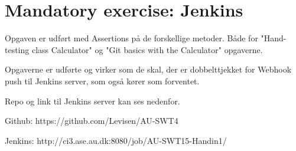 \section{Mandatory exercise: Jenkins}

Opgaven er udført med Assertions på de forskellige metoder. 
Både for "Hand-testing class Calculator" og "Git basics with the Calculator" opgaverne.

Opgaverne er udførte og virker som de skal, der er dobbelttjekket for Webhook push til Jenkins server, som også kører som forventet.

Repo og link til Jenkins server kan ses nedenfor.

Github: https://github.com/Levisen/AU-SWT4

Jenkins: http://ci3.ase.au.dk:8080/job/AU-SWT15-Handin1/